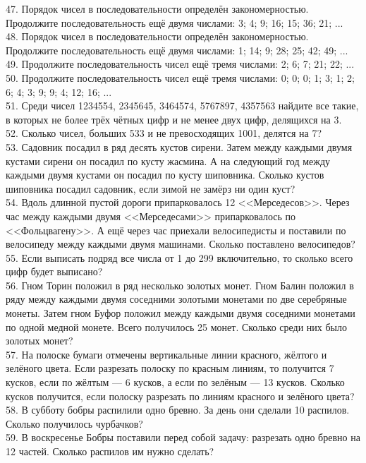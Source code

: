 47. Порядок чисел в последовательности определён закономерностью. Продолжите последовательность ещё двумя числами: 3; 4; 9; 16; 15; 36; 21; ...\\
48. Порядок чисел в последовательности определён закономерностью. Продолжите последовательность ещё двумя числами: 1; 14; 9; 28; 25; 42; 49; ...\\
49. Продолжите последовательность чисел ещё тремя числами: 2; 6; 7; 21; 22; ...\\
50. Продолжите последовательность чисел ещё тремя числами: 0; 0; 0; 1; 3; 1; 2; 6; 4; 3; 9; 9; 4; 12; 16; ...\\
51. Среди чисел 1234554, 2345645, 3464574, 5767897, 4357563 найдите все такие, в которых не более трёх чётных цифр и не менее двух цифр, делящихся на 3.\\
52. Сколько чисел, больших 533 и не превосходящих 1001, делятся на 7?\\
53. Садовник посадил в ряд десять кустов сирени. Затем между каждыми двумя кустами сирени он посадил по кусту жасмина. А на следующий год между каждыми двумя кустами он посадил по кусту шиповника. Сколько кустов шиповника посадил садовник, если зимой не замёрз ни один куст?\\
54. Вдоль длинной пустой дороги припарковалось 12 <<Мерседесов>>. Через час между каждыми двумя <<Мерседесами>> припарковалось по <<Фольцвагену>>. А ещё через час приехали велосипедисты и поставили по велосипеду между каждыми двумя машинами. Сколько поставлено велосипедов?\\
55. Если выписать подряд все числа от 1 до 299 включительно, то сколько всего цифр будет выписано?\\
56. Гном Торин положил в ряд несколько золотых монет. Гном Балин положил в ряду между каждыми двумя соседними золотыми монетами по две серебряные монеты. Затем гном Буфор положил между каждыми двумя соседними монетами по одной медной монете. Всего получилось 25 монет. Сколько среди них было золотых монет?\\
57. На полоске бумаги отмечены вертикальные линии красного, жёлтого и зелёного цвета. Если разрезать полоску по красным линиям, то получится 7 кусков, если по жёлтым --- 6 кусков, а если по зелёным --- 13 кусков. Сколько кусков получится, если полоску разрезать по линиям красного и зелёного цвета?\\
58. В субботу бобры распилили одно бревно. За день они сделали 10 распилов. Сколько получилось чурбачков?\\
59. В воскресенье Бобры поставили перед собой задачу: разрезать одно бревно на 12 частей. Сколько распилов им нужно сделать?\\
